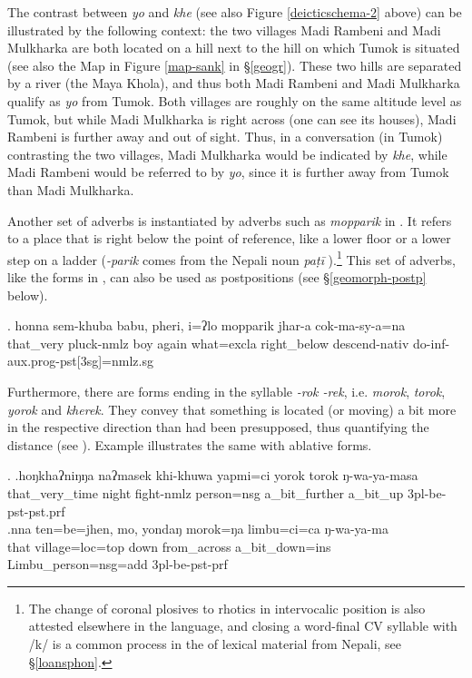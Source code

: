 The contrast between \emph{yo} and \emph{khe} (see also Figure \ref{deicticschema-2} above) can be illustrated by the following context: the two villages Madi Rambeni and Madi Mulkharka are both located on a hill next to the hill on which Tumok is situated (see also the Map in Figure \ref{map-sank} in §\ref{geogr}). These two hills are separated by a river (the Maya Khola), and thus both Madi Rambeni and Madi Mulkharka qualify as \emph{yo}  from Tumok. Both villages are roughly on the same altitude level as Tumok, but while Madi Mulkharka is right across (one can see its houses), Madi Rambeni is further away and out of sight. Thus, in a conversation (in Tumok) contrasting the two villages, Madi Mulkharka would be indicated by \emph{khe}, while Madi Rambeni would be referred to by \emph{yo}, since it is further away from Tumok  than Madi Mulkharka.

Another set of adverbs is instantiated by adverbs such as \emph{mopparik}  in \Next. It refers to a place that is right below the point of reference, like a lower floor or a lower step on a ladder (\emph{-parik} comes from the Nepali noun \emph{paṭī} ).\footnote{The change of  coronal plosives to rhotics in intervocalic position is also attested elsewhere in the language, and closing a word-final CV syllable with /k/ is a common process in the  of lexical material from Nepali, see §\ref{loansphon}.} This set of adverbs, like the forms in \Last, can also be used  as  postpositions (see §\ref{geomorph-postp} below). 

\exg. honna              sem-khuba        babu, pheri, i=ʔlo       mopparik    jhar-a          cok-ma-sy-a=na\\
that\_very pluck{\sc -nmlz} boy again what{\sc =excla} right\_below descend{\sc -nativ} do{\sc -inf-aux.prog-pst[3sg]=nmlz.sg} \\
 


Furthermore, there are forms ending in the syllable \emph{-rok \ti -rek}, i.e. \emph{morok}, \emph{torok}, \emph{yorok} and \emph{kherek}. They convey that something is located (or moving) a bit more in the respective direction than had been presupposed, thus quantifying the distance (see \Next). Example \NNext illustrates the same with ablative forms. 

\ex. \ag.hoŋkhaʔniŋŋa   naʔmasek    khi-khuwa          yapmi=ci     yorok      torok      ŋ-wa-ya-masa\\
that\_very\_time night fight{\sc -nmlz} person{\sc =nsg} a\_bit\_further a\_bit\_up {\sc 3pl-}be{\sc -pst-pst.prf}\\
 
\bg.nna  ten=be=jhen,         mo,   yondaŋ    morok=ŋa       limbu=ci=ca           ŋ-wa-ya-ma\\
that village{\sc =loc=top} down from\_across a\_bit\_down{\sc =ins} Limbu\_person{\sc =nsg=add} {\sc 3pl-}be{\sc -pst-prf}\\
 

